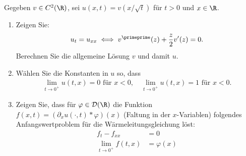 
\begin{exercise}

Gegeben $v \in C^2(\R)$, sei $u(x,t) = v\left(x/\sqrt{t}\right)$ für $t > 0$ und $x \in \R$.
\begin{enumerate}[label = (\roman*)]
  \item Zeigen Sie:
  \begin{align*}
    u_t = u_{xx} \iff v^{\primeprime}(z) + \frac{z}{2}v^{\prime}(z) = 0.
  \end{align*}
  Berechnen Sie die allgemeine Lösung $v$ und damit $u$.
  \item Wählen Sie die Konstanten in $u$ so, dass
  \begin{align*}
    \lim_{t \to 0^+} u(t,x) = 0 \text{ für } x < 0, \quad \lim_{t \to 0^+} u(t,x) = 1
    \text{ für } x < 0.
  \end{align*}
  \item Zeigen Sie, dass für $\varphi \in \mathcal{D}(\R)$ die Funktion
  $f(x,t) = (\partial_x u(\cdot,t)\ast \varphi)(x)$ (Faltung in der $x$-Variablen)
  folgendes Anfangswertproblem für die Wärmeleitungsgleichung löst:
  \begin{align*}
    f_t - f_{xx} &= 0 \\
    \lim_{t \to 0^+} f(t,x) &= \varphi(x)
  \end{align*}
\end{enumerate}
\end{exercise}


\begin{solution}

\phantom{}

\end{solution}

